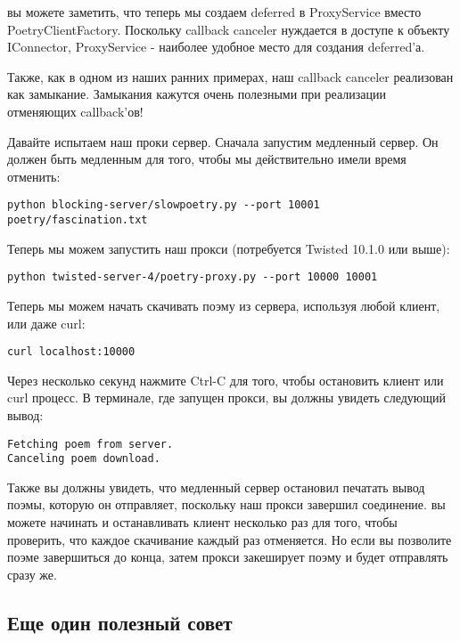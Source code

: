 вы можете заметить, что теперь мы создаем deferred в 
ProxyService вместо PoetryClientFactory. Поскольку 
callback canceler нуждается в доступе к объекту IConnector, 
ProxyService - наиболее удобное место для создания 
deferred'а.


Также, как в одном из наших ранних примерах, наш callback 
canceler реализован как замыкание. Замыкания кажутся очень 
полезными при реализации отменяющих callback'ов!


Давайте испытаем наш проки сервер. Сначала запустим медленный сервер. 
Он должен быть медленным для того, чтобы мы действительно имели 
время отменить:

 \begin{verbatim}
python blocking-server/slowpoetry.py --port 10001 poetry/fascination.txt
\end{verbatim} 

Теперь мы можем запустить наш прокси (потребуется Twisted 10.1.0 или выше):

 \begin{verbatim}
python twisted-server-4/poetry-proxy.py --port 10000 10001
\end{verbatim} 

Теперь мы можем начать скачивать поэму из сервера, используя любой 
клиент, или даже curl:

 \begin{verbatim}
curl localhost:10000
\end{verbatim} 

Через несколько секунд нажмите Ctrl-C для того, чтобы остановить 
клиент или curl процесс. В терминале, где запущен прокси, вы должны 
увидеть следующий вывод:

 \begin{verbatim}
Fetching poem from server.
Canceling poem download.
\end{verbatim} 


Также вы должны увидеть, что медленный сервер 
остановил печатать вывод поэмы, которую он отправляет, 
поскольку наш прокси завершил соединение. вы можете 
начинать и останавливать клиент несколько раз для того, чтобы 
проверить, что каждое скачивание каждый раз отменяется. Но если 
вы позволите поэме завершиться до конца, затем прокси закеширует 
поэму и будет отправлять сразу же.


\subsection{Еще один полезный совет}

